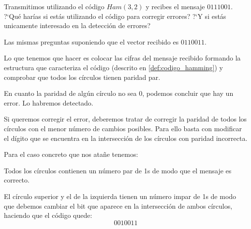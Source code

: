 \begin{problem}[7]
\ppart Transmitimos utilizando el código $Ham(3,2)$ y recibes el
mensaje $0111001$. ?`Qué harías si estás utilizando el código para
corregir errores? ?`Y si estás unicamente interesado en la
detección de errores?

\ppart Las mismas preguntas suponiendo que el vector recibido es
$0110011$.


\solution


\spart

Lo que tenemos que hacer es colocar las cifras del mensaje recibido formando la estructura que caracteriza el código (descrito en \ref{def:codigo_hamming}) y comprobar que todos los círculos tienen paridad par.

En cuanto la paridad de algún círculo no sea 0, podemos concluir que hay un error. Lo habremos detectado.

Si queremos corregir el error, deberemos tratar de corregir la paridad de todos los círculos con el menor número de cambios posibles. Para ello basta con modificar el dígito que se encuentra en la intersección de los círculos con paridad incorrecta.

Para el caso concreto que nos atañe tenemos:

\begin{minipage}{0.57\textwidth}
Todos los círculos contienen un número par de 1s de modo que el mensaje es correcto.

\end{minipage}
\begin{minipage}{0.42\textwidth}
\begin{center}
\end{center}
\end{minipage}

\spart

\begin{minipage}{0.57\textwidth}
El círculo superior y el de la izquierda tienen un número impar de 1s de modo que debemos cambiar el bit que aparece en la intersección de ambos círculos, haciendo que el código quede:
\[0010011\]
\end{minipage}
\begin{minipage}{0.42\textwidth}
\begin{center}
\end{center}
\end{minipage}

\end{problem}



